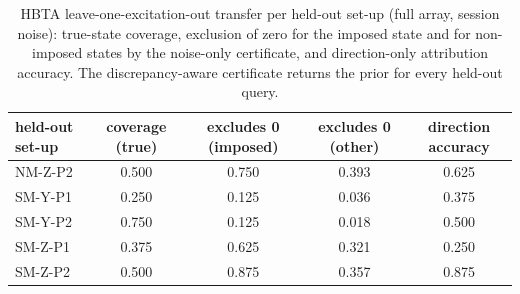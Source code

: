 \begin{table}[h]\centering\footnotesize
\caption{HBTA leave-one-excitation-out transfer per held-out set-up (full array, session noise): true-state coverage, exclusion of zero for the imposed state and for non-imposed states by the noise-only certificate, and direction-only attribution accuracy. The discrepancy-aware certificate returns the prior for every held-out query.}\label{tab:s12}
\begin{tabular}{lcccc}\toprule held-out set-up & coverage (true) & excludes 0 (imposed) & excludes 0 (other) & direction accuracy\\ \midrule
NM-Z-P2 & 0.500 & 0.750 & 0.393 & 0.625 \\
SM-Y-P1 & 0.250 & 0.125 & 0.036 & 0.375 \\
SM-Y-P2 & 0.750 & 0.125 & 0.018 & 0.500 \\
SM-Z-P1 & 0.375 & 0.625 & 0.321 & 0.250 \\
SM-Z-P2 & 0.500 & 0.875 & 0.357 & 0.875 \\
\bottomrule\end{tabular}\end{table}
